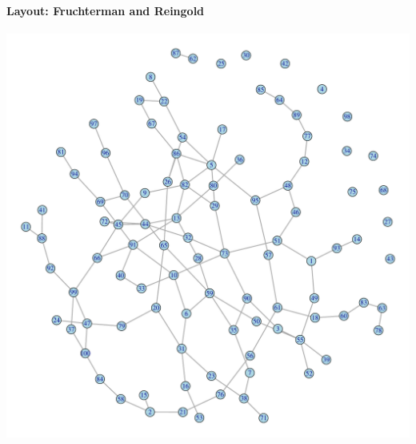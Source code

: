 \documentclass[8pt]{beamer}
\begin{document}

\begin{frame}
\frametitle{\insertsection}
\framesubtitle{Layout: Fruchterman and Reingold}

\centering
\includegraphics[height=0.85\textheight]{fr}
 
\end{frame}

\end{document}
